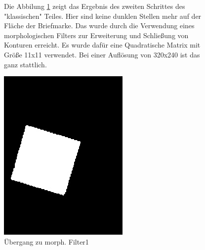 \documentclass[12pt,toc=bib,toc=listof]{scrreprt}
\begin{document}
\begin{figure}[h]
\begin{minipage}[t]{.75\linewidth}

Die Abbilung \ref{fig:bv_morph1} zeigt das Ergebnis des zweiten Schrittes des "klassischen" Teiles. Hier sind keine dunklen Stellen mehr auf der Fläche der Briefmarke. Das wurde durch die Verwendung eines morphologischen Filters zur Erweiterung und Schließung von Konturen erreicht. Es wurde dafür eine Quadratische Matrix mit Größe 11x11 verwendet. Bei einer Auflösung von 320x240 ist das ganz stattlich. 
\end{minipage}
\hfill
\begin{minipage}[t]{.2\linewidth}
\strut\vspace*{-\baselineskip}
\newline
  \includegraphics[width=\linewidth]{./bilder/bin1morph}
  \caption{Übergang zu morph. Filter1}
  \label{fig:bv_morph1}
\end{minipage}
\end{figure}
\end{document}
